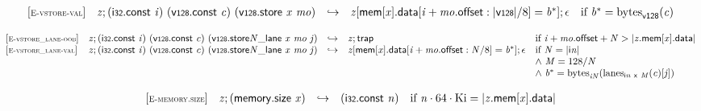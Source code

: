 $$\begin{array}{@{}l@{}lcl@{}l@{}}
{[\textsc{\scriptsize E{-}vstore{-}val}]} \quad & {\mathit{z}} ; (\mathsf{i{\scriptstyle32}}.\mathsf{const}~{\mathit{i}})~(\mathsf{v{\scriptstyle128}}.\mathsf{const}~{\mathit{c}})~(\mathsf{v{\scriptstyle128}.store}~{\mathit{x}}~{\mathit{mo}}) &\hookrightarrow& {\mathit{z}}{}[\mathsf{mem}{}[{\mathit{x}}].\mathsf{data}{}[{\mathit{i}} + {\mathit{mo}}.\mathsf{offset} : {|\mathsf{v{\scriptstyle128}}|} / 8] = {{\mathit{b}}^\ast}] ; \epsilon &\quad
  \mbox{if}~{{\mathit{b}}^\ast} = {{\mathrm{bytes}}}_{\mathsf{v{\scriptstyle128}}}({\mathit{c}}) \\
\end{array}
$$

\vspace{1ex}

$$
\begin{array}{@{}l@{}lcl@{}l@{}}
{[\textsc{\scriptsize E{-}vstore\_lane{-}oob}]} \quad & {\mathit{z}} ; (\mathsf{i{\scriptstyle32}}.\mathsf{const}~{\mathit{i}})~(\mathsf{v{\scriptstyle128}}.\mathsf{const}~{\mathit{c}})~({{{\mathsf{v{\scriptstyle128}.store}}{{\mathit{N}}}}{\mathsf{\_}}}{\mathsf{lane}}~{\mathit{x}}~{\mathit{mo}}~{\mathit{j}}) &\hookrightarrow& {\mathit{z}} ; \mathsf{trap} &\quad
  \mbox{if}~{\mathit{i}} + {\mathit{mo}}.\mathsf{offset} + {\mathit{N}} > {|{{\mathit{z}}.\mathsf{mem}}{{}[{\mathit{x}}]}.\mathsf{data}|} \\
{[\textsc{\scriptsize E{-}vstore\_lane{-}val}]} \quad & {\mathit{z}} ; (\mathsf{i{\scriptstyle32}}.\mathsf{const}~{\mathit{i}})~(\mathsf{v{\scriptstyle128}}.\mathsf{const}~{\mathit{c}})~({{{\mathsf{v{\scriptstyle128}.store}}{{\mathit{N}}}}{\mathsf{\_}}}{\mathsf{lane}}~{\mathit{x}}~{\mathit{mo}}~{\mathit{j}}) &\hookrightarrow& {\mathit{z}}{}[\mathsf{mem}{}[{\mathit{x}}].\mathsf{data}{}[{\mathit{i}} + {\mathit{mo}}.\mathsf{offset} : {\mathit{N}} / 8] = {{\mathit{b}}^\ast}] ; \epsilon &\quad
  \mbox{if}~{\mathit{N}} = {|{\mathsf{i}}{{\mathit{n}}}|} \\
 &&&&\quad {\land}~{\mathit{M}} = 128 / {\mathit{N}} \\
 &&&&\quad {\land}~{{\mathit{b}}^\ast} = {{\mathrm{bytes}}}_{{{\mathit{i}}}{{\mathit{N}}}}({{\mathrm{lanes}}}_{{\mathsf{i}}{{\mathit{n}}}~\mathsf{x}~{\mathit{M}}}({\mathit{c}}){}[{\mathit{j}}]) \\
\end{array}
$$

\vspace{1ex}

$$
\begin{array}{@{}l@{}lcl@{}l@{}}
{[\textsc{\scriptsize E{-}memory.size}]} \quad & {\mathit{z}} ; (\mathsf{memory.size}~{\mathit{x}}) &\hookrightarrow& (\mathsf{i{\scriptstyle32}}.\mathsf{const}~{\mathit{n}}) &\quad
  \mbox{if}~{\mathit{n}} \cdot 64 \cdot {\mathrm{Ki}} = {|{{\mathit{z}}.\mathsf{mem}}{{}[{\mathit{x}}]}.\mathsf{data}|} \\
\end{array}
$$

